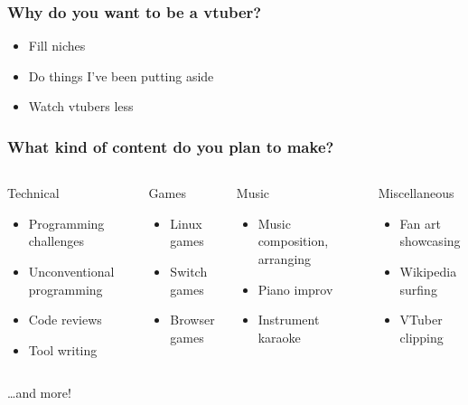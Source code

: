 \documentclass[lualatex,aspectratio=169]{beamer}
\begin{document}
  \begin{frame}
    \frametitle{Why do you want to be a vtuber?}
    \begin{itemize}
      \item Fill niches
      \item Do things I've been putting aside
      \item \pause Watch vtubers less
    \end{itemize}
  \end{frame}

  \begin{frame}
    \frametitle{What kind of content do you plan to make?}

    \begin{columns}[T]

      \begin{block}{Technical}
        \begin{itemize}
          \item Programming challenges
          \item Unconventional programming
          \item Code reviews
          \item Tool writing
        \end{itemize}
      \end{block}

      \begin{block}{Games}
        \begin{itemize}
          \item Linux games
          \item Switch games
          \item Browser games
        \end{itemize}
      \end{block}


      \begin{block}{Music}
        \begin{itemize}
          \item Music composition, arranging
          \item Piano improv
          \item Instrument karaoke
        \end{itemize}
      \end{block}

      \begin{block}{Miscellaneous}
        \begin{itemize}
          \item Fan art showcasing
          \item Wikipedia surfing
          \item VTuber clipping
        \end{itemize}
      \end{block}
    \end{columns}
    {\raggedleft\hfill\ldots and more!}
  \end{frame}
\end{document}

